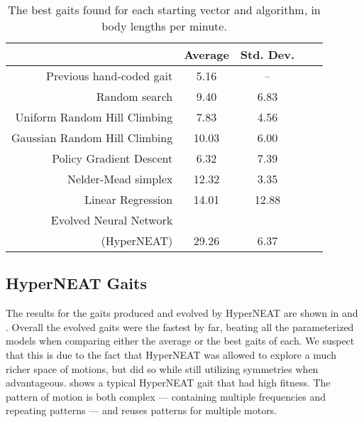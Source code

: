 \begin{table}
\begin{center}
\begin{tabular}{|r|c|c|c||c|}
\hline
                                         & Average & Std. Dev. \\
\hline                                    
\hline                                    
Previous hand-coded gait                 & 5.16   &   --     \\
\hline
Random search                            & 9.40   &   6.83   \\
\hline
Uniform Random Hill Climbing             & 7.83   &   4.56   \\
\hline
Gaussian Random Hill Climbing            & 10.03  &   6.00   \\
\hline
Policy Gradient Descent                  & 6.32   &   7.39   \\
\hline
Nelder-Mead simplex                      & 12.32  &   3.35   \\
\hline
Linear Regression                        & 14.01  &  12.88   \\
\hline
Evolved Neural Network              &        &          \\
(HyperNEAT)                              & 29.26  &   6.37   \\
\hline
\end{tabular}
\caption{The best gaits found for each starting vector and algorithm,
  in body lengths per minute.}
\end{center}
\end{table}







\subsection{HyperNEAT Gaits}

The results for the gaits produced and evolved by HyperNEAT are shown
in  and .  Overall the evolved gaits
were the fastest by far, beating all the parameterized models when
comparing either the average or the best gaits of each.  We suspect
that this is due to the fact that HyperNEAT was allowed to explore a
much richer space of motions, but did so while still utilizing
symmetries when advantageous.
 shows a typical
HyperNEAT gait that had high fitness.  The pattern of motion is both
complex --- containing multiple frequencies and repeating patterns ---
and reuses patterns for multiple motors.

